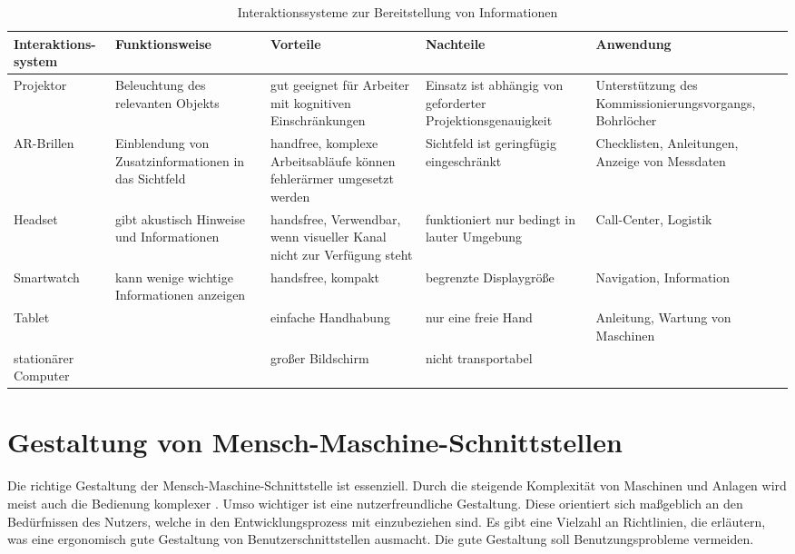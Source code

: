 \begin{sidewaystable}[ph!]
\begin{tabular}{p{}|p{}|p{}|p{}|p{}}
	\textbf{Interaktions-system} & \textbf{Funktionsweise} & \textbf{Vorteile} & \textbf{Nachteile} & \textbf{Anwendung} \\
	\hline
	Projektor & Beleuchtung des relevanten Objekts & gut geeignet für Arbeiter mit kognitiven Einschränkungen & Einsatz ist abhängig von geforderter Projektionsgenauigkeit & Unterstützung des Kommissionierungsvorgangs, Bohrlöcher \\
	\hline
	AR-Brillen & Einblendung von Zusatzinformationen in das Sichtfeld & handfree, komplexe Arbeitsabläufe können fehlerärmer umgesetzt werden & Sichtfeld ist geringfügig eingeschränkt & Checklisten, Anleitungen, Anzeige von Messdaten \\
	\hline
	Headset & gibt akustisch Hinweise und Informationen & handsfree, Verwendbar, wenn visueller Kanal nicht zur Verfügung steht & funktioniert nur bedingt in lauter Umgebung & Call-Center, Logistik \\
	\hline
	Smartwatch & kann wenige wichtige Informationen anzeigen & handsfree, kompakt & begrenzte Displaygröße & Navigation, Information \\
	\hline
	Tablet & & einfache Handhabung & nur eine freie Hand & Anleitung, Wartung von Maschinen\\
	\hline
	stationärer Computer & & großer Bildschirm & nicht transportabel & \\
\end{tabular}
\caption{Interaktionssysteme zur Bereitstellung von Informationen}
\label{tab:Interaktionssystem}
\end{sidewaystable}

\section{Gestaltung von Mensch-Maschine-Schnittstellen}
Die richtige Gestaltung der Mensch-Maschine-Schnittstelle ist essenziell. Durch die steigende Komplexität von Maschinen und Anlagen wird meist auch die Bedienung komplexer \cite{Zuhlke2012}. Umso wichtiger ist eine nutzerfreundliche Gestaltung. Diese orientiert sich maßgeblich an den Bedürfnissen des Nutzers, welche in den Entwicklungsprozess mit einzubeziehen sind. \cite{Heinecke2012, Zuhlke2012} Es gibt eine Vielzahl an Richtlinien, die erläutern, was eine ergonomisch gute Gestaltung von Benutzerschnittstellen ausmacht. Die gute Gestaltung soll Benutzungsprobleme vermeiden.

